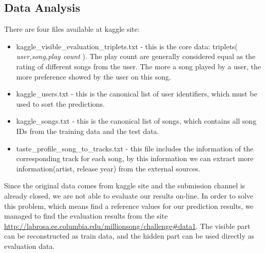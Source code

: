 \documentclass{article}
\begin{document}
\subsection{Data Analysis}
There are four files available at kaggle site:
\begin{itemize}
\item  {kaggle\_visible\_evaluation\_triplets.txt} - this is the core data: triplets( \emph{user,song,play count} ). The play count are generally considered equal as the rating of different songs from the user. The more a song played by a user, the more preference showed by the user on this song.
\item {kaggle\_users.txt} - this is the canonical list of user identifiers, which must be used to sort the predictions.
\item {kaggle\_songs.txt} - this is the canonical list of songs, which contains all song IDs from the training data and the test data.
\item {taste\_profile\_song\_to\_tracks.txt} - this file includes the information of the corresponding track for each song, by this information we can extract more information(artist, release year) from the external sources.
\end{itemize}

Since the original data comes from kaggle site and the submission channel is already closed, we are not able to evaluate our results on-line. In order to solve this problem, which means find a reference values for our prediction results, we managed to find the evaluation results from the site  \url{http://labrosa.ee.columbia.edu/millionsong/challenge#data1}. The visible part can be reconstructed as train data, and the hidden part can be used directly as evaluation data.
\end{document}
